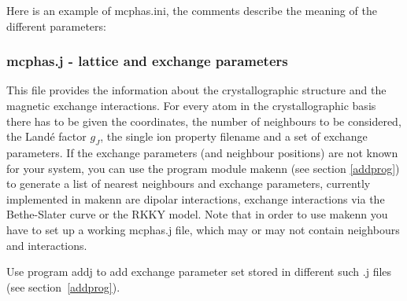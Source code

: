 Here is an example of {\prg mcphas.ini}, the comments describe the meaning of the different
parameters:





\subsubsection{{\prg mcphas.j} - lattice and exchange parameters}\label{mcphasj}
This file provides the information about 
the crystallographic
 structure and the magnetic exchange interactions.
For every atom in the crystallographic basis there
has to be given the coordinates, the number of neighbours to be considered, the 
Land\'e factor $g_J$, the single ion property filename and  a set of exchange parameters.
If the exchange parameters (and neighbour positions) are not known for your system, you 
can use the program module {\prg makenn} (see section \ref{addprog}) to generate 
a list of nearest neighbours and
exchange parameters, currently implemented in {\prg makenn} are dipolar interactions,
exchange interactions via the Bethe-Slater curve or the RKKY model. Note that in order
to use {\prg makenn} you have to set up a working {\prg mcphas.j} file, which may or
may not contain neighbours and interactions.

Use program {\prg addj} to add exchange parameter set stored in different 
such {\prg .j} files (see section~\ref{addprog}).



